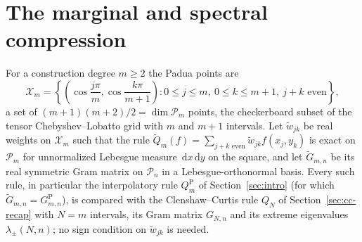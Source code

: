 \documentclass[preprint,12pt,a4paper]{elsarticle}
\theoremstyle{remark}
\newcommand{\dd}{\,\mathrm d}
\begin{document}
\section{The marginal and spectral compression}\label{sec:marginal}

For a construction degree $m\ge2$ the Padua points are
\begin{equation}\label{eq:padua}
 \mathcal X_m=\left\{\left(\cos\frac{j\pi}{m},
                   \cos\frac{k\pi}{m+1}\right):
    0\le j\le m,\ 0\le k\le m+1,\ j+k\text{ even}\right\},
\end{equation}
a set of $(m+1)(m+2)/2=\dim\mathcal P_m$ points, the checkerboard subset of the
tensor Chebyshev--Lobatto grid with $m$ and $m+1$ intervals.
Let $\widetilde w_{jk}$ be real weights on $\mathcal X_m$ such that the rule
$\widetilde Q_m(f)=\sum_{j+k\text{ even}}\widetilde w_{jk}f(x_j,y_k)$ is exact on
$\mathcal P_m$ for unnormalized Lebesgue measure $\dd x\dd y$ on the square, and
let $\widetilde G_{m,n}$ be its real symmetric Gram matrix on $\mathcal P_n$ in a
Lebesgue-orthonormal basis. Every such rule, in particular the interpolatory
rule $Q_m^{\mathrm P}$ of Section~\ref{sec:intro} (for which
$\widetilde G_{m,n}=G^{\mathrm P}_{m,n}$), is compared with the Clenshaw--Curtis
rule $Q_N$ of Section~\ref{sec:cc-recap} with $N=m$ intervals, its Gram matrix
$G_{N,n}$ and its extreme eigenvalues $\lambda_\pm(N,n)$; no sign condition on
$\widetilde w_{jk}$ is needed.
\end{document}
